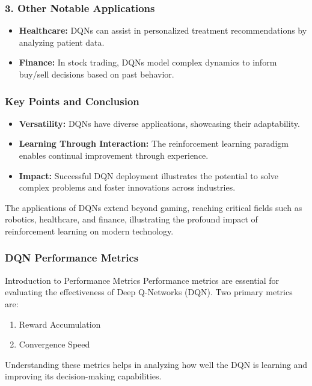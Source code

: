 \documentclass[aspectratio=169]{beamer}
\begin{document}
\begin{frame}[fragile]
    \frametitle{3. Other Notable Applications}
    \begin{itemize}
        \item \textbf{Healthcare:} DQNs can assist in personalized treatment recommendations by analyzing patient data.
        \item \textbf{Finance:} In stock trading, DQNs model complex dynamics to inform buy/sell decisions based on past behavior.
    \end{itemize}
\end{frame}

\begin{frame}[fragile]
    \frametitle{Key Points and Conclusion}
    \begin{itemize}
        \item \textbf{Versatility:} DQNs have diverse applications, showcasing their adaptability.
        \item \textbf{Learning Through Interaction:} The reinforcement learning paradigm enables continual improvement through experience.
        \item \textbf{Impact:} Successful DQN deployment illustrates the potential to solve complex problems and foster innovations across industries.
    \end{itemize}
    
    The applications of DQNs extend beyond gaming, reaching critical fields such as robotics, healthcare, and finance, illustrating the profound impact of reinforcement learning on modern technology.
\end{frame}

\begin{frame}[fragile]
    \frametitle{DQN Performance Metrics}
    \begin{block}{Introduction to Performance Metrics}
        Performance metrics are essential for evaluating the effectiveness of Deep Q-Networks (DQN). 
        Two primary metrics are:
        \begin{enumerate}
            \item Reward Accumulation
            \item Convergence Speed
        \end{enumerate}
        Understanding these metrics helps in analyzing how well the DQN is learning and improving its decision-making capabilities.
    \end{block}
\end{frame}
\end{document}
